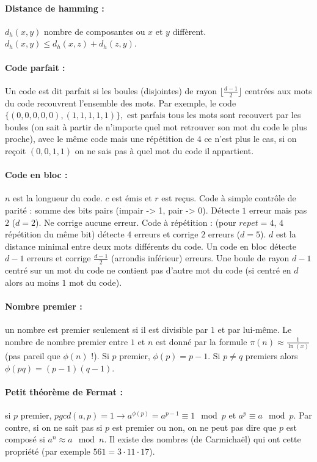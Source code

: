 \documentclass[11pt,a4paper]{report}
\author{Sylvain Julmy}
\begin{document}
\paragraph*{Distance de hamming :} $d_h(x,y)$ nombre de composantes ou $x$ et $y$ diffèrent. $d_h(x,y) \leq d_h(x,z) + d_h(z,y)$.

\paragraph*{Code parfait :} Un code est dit parfait si les boules (disjointes) de rayon $\lfloor\frac{d-1}{2}\rfloor$ centrées aux mots du code recouvrent l'ensemble des mots. Par exemple, le code $\{(0,0,0,0,0),(1,1,1,1,1)\},$ est parfais tous les mots sont recouvert par les boules (on sait à partir de n'importe quel mot retrouver son mot du code le plus proche), avec le même code mais une répétition de $4$ ce n'est plus le cas, si on reçoit $(0,0,1,1)$ on ne sais pas à quel mot du code il appartient. 

\paragraph*{Code en bloc :}$n$ est la longueur du code. $c$ est émis et $r$ est reçus. Code à simple contrôle de parité : somme des bits pairs (impair -> 1, pair -> 0). Détecte $1$ erreur mais pas $2$ ($d=2$). Ne corrige aucune erreur. Code à répétition : (pour $repet=4$, $4$ répétition du même bit) détecte $4$ erreurs et corrige $2$ erreurs ($d=5$). $d$ est la distance minimal entre deux mots différents du code. Un code en bloc détecte $d-1$ erreurs et corrige $\frac{d-1}{2}$ (arrondis inférieur) erreurs. Une boule de rayon $d-1$ centré sur un mot du code ne contient pas d'autre mot du code (si centré en $d$ alors au moins $1$ mot du code).

\paragraph*{Nombre premier :} un nombre est premier seulement si il est divisible par $1$ et par lui-même. Le nombre de nombre premier entre $1$ et $n$ est donné par la formule $\pi(n)\approx\frac{1}{\ln(x)}$ (pas pareil que $\phi(n)$ !). Si $p$ premier, $\phi(p)=p-1$. Si $p \neq q$ premiers alors $\phi(pq)=(p-1)(q-1)$.

\paragraph*{Petit théorème de Fermat :} si $p$ premier, $pgcd(a,p)=1 \rightarrow a^{\phi(p)} = a^{p-1} \equiv 1 \mod p$ et $a^p \equiv a \mod p$. Par contre, si on ne sait pas si $p$ est premier ou non, on ne peut pas dire que $p$ est composé si $a^n\approx a\mod n$. Il existe des nombres (de Carmichaël) qui ont cette propriété (par exemple $561=3\cdot11\cdot17$).
\end{document}
